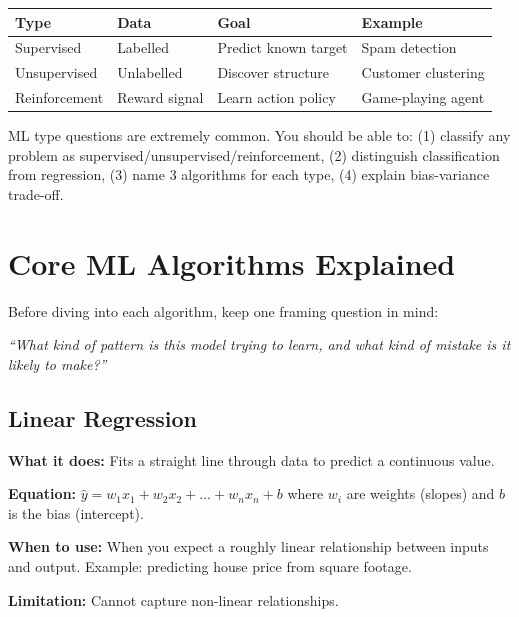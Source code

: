 \documentclass[12pt, a4paper, oneside]{book}
\begin{document}
\begin{center}
\begin{tabular}{l l l l}
\toprule
\textbf{Type} & \textbf{Data} & \textbf{Goal} & \textbf{Example} \\
\midrule
Supervised & Labelled & Predict known target & Spam detection \\
Unsupervised & Unlabelled & Discover structure & Customer clustering \\
Reinforcement & Reward signal & Learn action policy & Game-playing agent \\
\bottomrule
\end{tabular}
\end{center}

\begin{interviewbox}
ML type questions are extremely common. You should be able to: (1) classify any problem as supervised/unsupervised/reinforcement, (2) distinguish classification from regression, (3) name 3 algorithms for each type, (4) explain bias-variance trade-off.
\end{interviewbox}

\section{Core ML Algorithms Explained}

Before diving into each algorithm, keep one framing question in mind:
\begin{center}
\textit{``What kind of pattern is this model trying to learn, and what kind of mistake is it likely to make?''}
\end{center}

\subsection{Linear Regression}

\textbf{What it does:} Fits a straight line through data to predict a continuous value.

\textbf{Equation:} $\hat{y} = w_1 x_1 + w_2 x_2 + \ldots + w_n x_n + b$ where $w_i$ are weights (slopes) and $b$ is the bias (intercept).

\textbf{When to use:} When you expect a roughly linear relationship between inputs and output. Example: predicting house price from square footage.

\textbf{Limitation:} Cannot capture non-linear relationships.
\end{document}
